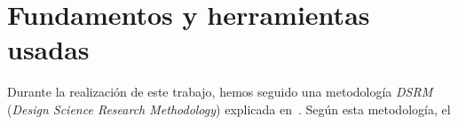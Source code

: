 \chapter{Fundamentos y herramientas usadas\label{05methodology}}

Durante la realización de este trabajo, hemos seguido una metodología
\emph{DSRM} (\emph{Design Science Research Methodology}) explicada
en~\cite{peffers2008, vaishnavi2013}. Según esta metodología, el

